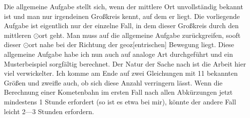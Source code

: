 Die allgemeine Aufgabe stellt sich, wenn der mittlere Ort unvollständig bekannt ist und man nur irgendeinen Großkreis kennt, auf dem er liegt. Die vorliegende Aufgabe ist eigentlich nur der einzelne Fall, in dem dieser Großkreis durch den mittleren \(\odot\)ort geht. Man muss auf die allgemeine Aufgabe zurückgreifen, sooft dieser \(\odot\)ort nahe bei der Richtung der geoz[entrischen] Bewegung liegt. Diese allgemeine Aufgabe habe ich nun auch auf analoge Art durchgeführt und ein Musterbeispiel sorgfältig berechnet\HistoricalNoteEight{Siehe die folgende Notiz.]}. Der Natur der Sache nach ist die Arbeit hier viel verwickelter. Ich komme am Ende auf zwei Gleichungen mit 11 bekannten Größen und zweifle auch, ob sich diese Anzahl verringern lässt. Wenn die Berechnung einer Kometenbahn im ersten Fall nach allen Abkürzungen jetzt mindestens 1 Stunde erfordert (so ist es etwa bei mir), könnte der andere Fall leicht 2—3 Stunden erfordern.
\par\medskip\noindent\makebox[\linewidth]{\rule{.18\linewidth}{.35pt}}\par
